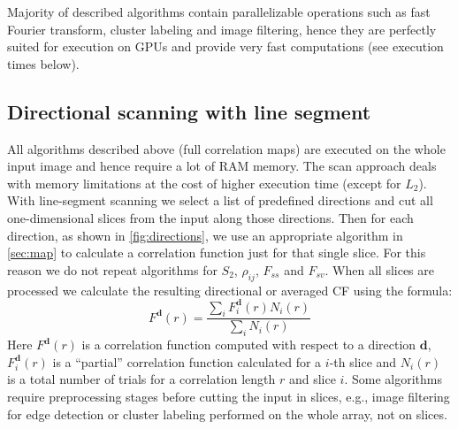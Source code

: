 \documentclass[1p]{elsarticle}
\begin{document}
Majority of described algorithms contain parallelizable operations such as fast
Fourier transform, cluster labeling and image filtering, hence they are
perfectly suited for execution on GPUs and provide very fast computations (see
execution times below).

\subsection{Directional scanning with line segment}
\label{sec:scan}
All algorithms described above (full correlation maps) are executed on the whole
input image and hence require a lot of RAM memory. The scan approach deals with
memory limitations at the cost of higher execution time (except for $L_2$). With
line-segment scanning we select a list of predefined directions and cut all
one-dimensional slices from the input along those directions. Then for each
direction, as shown in \cref{fig:directions}, we use an appropriate algorithm in
\cref{sec:map} to calculate a correlation function just for that single
slice. For this reason we do not repeat algorithms for $S_2$, $\rho_{ij}$,
$F_{ss}$ and $F_{sv}$.  When all slices are processed we calculate the resulting
directional or averaged CF using the formula:
\begin{equation*}
  F^{\bm{d}}(r) = \frac{\sum\limits_i F^{\bm{d}}_i(r) N_i(r)}{\sum\limits_i N_i(r)}
\end{equation*}
Here $F^{\bm{d}}(r)$ is a correlation function computed with respect to a
direction $\bm{d}$, $F^{\bm{d}}_i(r)$ is a ``partial'' correlation
function calculated for a $i$-th slice and $N_i(r)$ is a total number of trials
for a correlation length $r$ and slice $i$. Some algorithms require
preprocessing stages before cutting the input in slices, e.g., image filtering
for edge detection or cluster labeling performed on the whole array, not on
slices.
\end{document}
